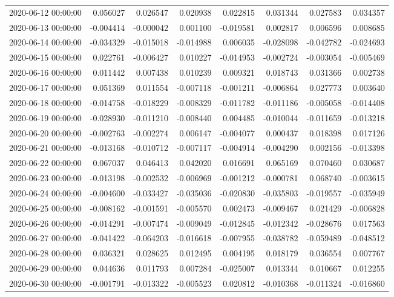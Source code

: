 \begin{tabular}{lrrrrrrr}
2020-06-12 00:00:00 & 0.056027 & 0.026547 & 0.020938 & 0.022815 & 0.031344 & 0.027583 & 0.034357 \\
2020-06-13 00:00:00 & -0.004414 & -0.000042 & 0.001100 & -0.019581 & 0.002817 & 0.006596 & 0.008685 \\
2020-06-14 00:00:00 & -0.034329 & -0.015018 & -0.014988 & 0.006035 & -0.028098 & -0.042782 & -0.024693 \\
2020-06-15 00:00:00 & 0.022761 & -0.006427 & 0.010227 & -0.014953 & -0.002724 & -0.003054 & -0.005469 \\
2020-06-16 00:00:00 & 0.011442 & 0.007438 & 0.010239 & 0.009321 & 0.018743 & 0.031366 & 0.002738 \\
2020-06-17 00:00:00 & 0.051369 & 0.011554 & -0.007118 & -0.001211 & -0.006864 & 0.027773 & 0.003640 \\
2020-06-18 00:00:00 & -0.014758 & -0.018229 & -0.008329 & -0.011782 & -0.011186 & -0.005058 & -0.014408 \\
2020-06-19 00:00:00 & -0.028930 & -0.011210 & -0.008440 & 0.004485 & -0.010044 & -0.011659 & -0.013218 \\
2020-06-20 00:00:00 & -0.002763 & -0.002274 & 0.006147 & -0.004077 & 0.000437 & 0.018398 & 0.017126 \\
2020-06-21 00:00:00 & -0.013168 & -0.010712 & -0.007117 & -0.004914 & -0.004290 & 0.002156 & -0.013398 \\
2020-06-22 00:00:00 & 0.067037 & 0.046413 & 0.042020 & 0.016691 & 0.065169 & 0.070460 & 0.030687 \\
2020-06-23 00:00:00 & -0.013198 & -0.002532 & -0.006969 & -0.001212 & -0.000781 & 0.068740 & -0.003615 \\
2020-06-24 00:00:00 & -0.004600 & -0.033427 & -0.035036 & -0.020830 & -0.035803 & -0.019557 & -0.035949 \\
2020-06-25 00:00:00 & -0.008162 & -0.001591 & -0.005570 & 0.002473 & -0.009467 & 0.021429 & -0.006828 \\
2020-06-26 00:00:00 & -0.014291 & -0.007474 & -0.009049 & -0.012845 & -0.012342 & -0.028676 & 0.017563 \\
2020-06-27 00:00:00 & -0.041422 & -0.064203 & -0.016618 & -0.007955 & -0.038782 & -0.059489 & -0.048512 \\
2020-06-28 00:00:00 & 0.036321 & 0.028625 & 0.012495 & 0.004195 & 0.018179 & 0.036554 & 0.007767 \\
2020-06-29 00:00:00 & 0.044636 & 0.011793 & 0.007284 & -0.025007 & 0.013344 & 0.010667 & 0.012255 \\
2020-06-30 00:00:00 & -0.001791 & -0.013322 & -0.005523 & 0.020812 & -0.010368 & -0.011324 & -0.016860 \\

\end{tabular}
